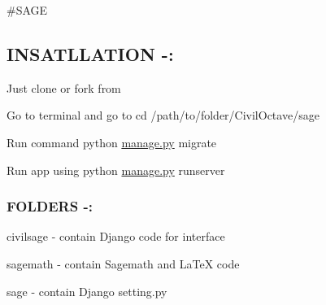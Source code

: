 \#\+S\+A\+G\+E

\subsection*{I\+N\+S\+A\+T\+L\+L\+A\+T\+I\+O\+N -\/\+:}


\begin{DoxyEnumerate}
\item Just clone or fork from
\item Go to terminal and go to cd /path/to/folder/\+Civil\+Octave/sage
\item Run command python \hyperlink{manage_8py}{manage.\+py} migrate
\item Run app using python \hyperlink{manage_8py}{manage.\+py} runserver
\end{DoxyEnumerate}

\subsubsection*{F\+O\+L\+D\+E\+R\+S -\/\+:}


\begin{DoxyEnumerate}
\item civilsage -\/ contain Django code for interface
\item sagemath -\/ contain Sagemath and La\+Te\+X code
\item sage -\/ contain Django setting.\+py 
\end{DoxyEnumerate}